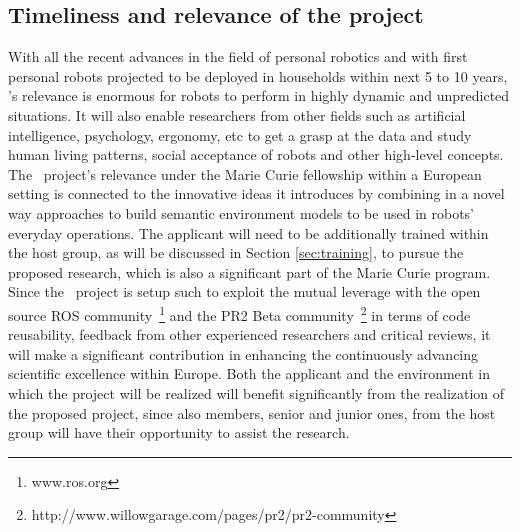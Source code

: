 \subsection{Timeliness and relevance of the project}
With all the recent advances in the field of personal robotics and with first
personal robots projected to be deployed in households within next 5 to 10 years, 
\ksem's relevance is enormous for robots to perform in highly dynamic and unpredicted
situations. It will also enable researchers from other fields such as artificial intelligence, 
psychology, ergonomy, etc to get a grasp at the data and study human living patterns, 
social acceptance of robots and other high-level concepts.
The \ksem\ project's relevance under the Marie Curie fellowship within a European 
setting is connected to the innovative ideas it introduces by combining in a novel way 
approaches to build semantic environment models to be used in robots' everyday operations.
The applicant will need to be additionally trained within the host group, as will be discussed in Section 
\ref{sec:training}, to pursue the proposed research, which is also a significant part of the Marie Curie program.
Since the \ksem\ project is setup such to exploit the mutual leverage with the open source ROS 
community~\footnote{www.ros.org} and the PR2 Beta community~\footnote{http://www.willowgarage.com/pages/pr2/pr2-community} 
in terms of code reusability, feedback from other experienced researchers and critical reviews, 
it will make a significant contribution in enhancing the continuously advancing scientific excellence within Europe. 
Both the applicant and the  environment in which the project will be realized will benefit significantly from the 
realization of the proposed project, since also members, senior and junior ones, from the 
host group will have their opportunity to assist the \ksem research. \\

